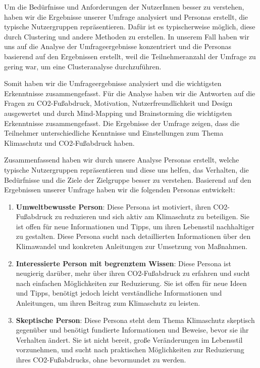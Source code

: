 Um die Bedürfnisse und Anforderungen der NutzerInnen besser zu verstehen, haben wir die Ergebnisse unserer Umfrage analysiert und Personas erstellt, die typische Nutzergruppen repräsentieren. Dafür ist es typischerweise möglich, diese durch Clustering und andere Methoden zu erstellen. In unserem Fall haben wir uns auf die Analyse der Umfrageergebnisse konzentriert und die Personas basierend auf den Ergebnissen erstellt, weil die Teilnehmeranzahl der Umfrage zu gering war, um eine Clusteranalyse durchzuführen.

Somit haben wir die Umfrageergebnisse analysiert und die wichtigsten Erkenntnisse zusammengefasst. Für die Analyse haben wir die Antworten auf die Fragen zu CO2-Fußabdruck, Motivation, Nutzerfreundlichkeit und Design ausgewertet und durch Mind-Mapping und Brainstorming die wichtigsten Erkenntnisse zusammengefasst. Die Ergebnisse der Umfrage zeigen, dass die Teilnehmer unterschiedliche Kenntnisse und Einstellungen zum Thema Klimaschutz und CO2-Fußabdruck haben.

Zusammenfassend haben wir durch unsere Analyse Personas erstellt, welche typische Nutzergruppen repräsentieren und diese uns helfen, das Verhalten, die Bedürfnisse und die Ziele der Zielgruppe besser zu verstehen. Basierend auf den Ergebnissen unserer Umfrage haben wir die folgenden Personas entwickelt:

\begin{enumerate}
    \item \textbf{Umweltbewusste Person}: Diese Persona ist motiviert, ihren CO2-Fußabdruck zu reduzieren und sich aktiv am Klimaschutz zu beteiligen. Sie ist offen für neue Informationen und Tipps, um ihren Lebensstil nachhaltiger zu gestalten. Diese Persona sucht nach detaillierten Informationen über den Klimawandel und konkreten Anleitungen zur Umsetzung von Maßnahmen.
    \item \textbf{Interessierte Person mit begrenztem Wissen}: Diese Persona ist neugierig darüber, mehr über ihren CO2-Fußabdruck zu erfahren und sucht nach einfachen Möglichkeiten zur Reduzierung. Sie ist offen für neue Ideen und Tipps, benötigt jedoch leicht verständliche Informationen und Anleitungen, um ihren Beitrag zum Klimaschutz zu leisten.

    \item \textbf{Skeptische Person}: Diese Persona steht dem Thema Klimaschutz skeptisch gegenüber und benötigt fundierte Informationen und Beweise, bevor sie ihr Verhalten ändert. Sie ist nicht bereit, große Veränderungen im Lebensstil vorzunehmen, und sucht nach praktischen Möglichkeiten zur Reduzierung ihres CO2-Fußabdrucks, ohne bevormundet zu werden.
\end{enumerate}

